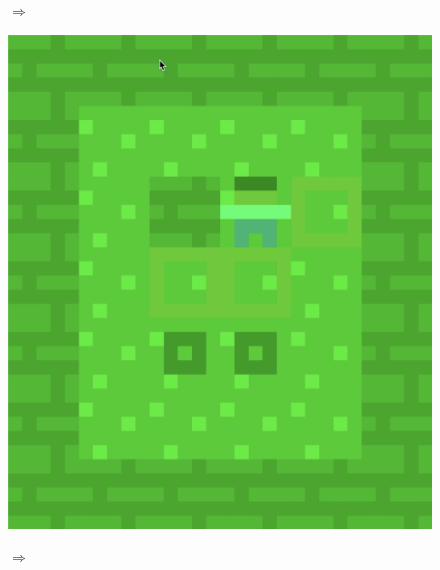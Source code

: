 \begin{figure}[!htbp]
\begin{minipage}[t]{0.2\textwidth}
\end{minipage}
$\Longrightarrow$
\begin{minipage}[t]{0.2\textwidth}
\includegraphics[width=\textwidth]{figures/maxii1_green.png} \hfill \\
\end{minipage}
$\Longrightarrow$
\begin{minipage}[t]{0.2\textwidth}

\end{minipage}
\end{figure}
